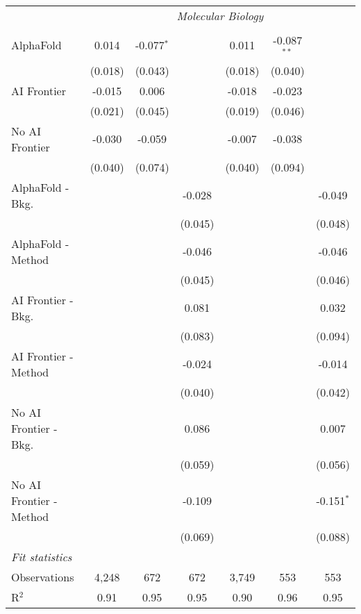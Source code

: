 \begin{tabular}{lcccccc}
 & \multicolumn{6}{c}{\textit{Molecular Biology}} \\ \\
   AlphaFold               & 0.014   & -0.077$^{*}$ &         & 0.011   & -0.087$^{**}$ &   \\   
                           & (0.018) & (0.043)      &         & (0.018) & (0.040)       &   \\   
   AI Frontier             & -0.015  & 0.006        &         & -0.018  & -0.023        &   \\   
                           & (0.021) & (0.045)      &         & (0.019) & (0.046)       &   \\   
   No AI Frontier          & -0.030  & -0.059       &         & -0.007  & -0.038        &   \\   
                           & (0.040) & (0.074)      &         & (0.040) & (0.094)       &   \\   
   AlphaFold - Bkg.        &         &              & -0.028  &         &               & -0.049\\   
                           &         &              & (0.045) &         &               & (0.048)\\   
   AlphaFold - Method      &         &              & -0.046  &         &               & -0.046\\   
                           &         &              & (0.045) &         &               & (0.046)\\   
   AI Frontier - Bkg.      &         &              & 0.081   &         &               & 0.032\\   
                           &         &              & (0.083) &         &               & (0.094)\\   
   AI Frontier - Method    &         &              & -0.024  &         &               & -0.014\\   
                           &         &              & (0.040) &         &               & (0.042)\\   
   No AI Frontier - Bkg.   &         &              & 0.086   &         &               & 0.007\\   
                           &         &              & (0.059) &         &               & (0.056)\\   
   No AI Frontier - Method &         &              & -0.109  &         &               & -0.151$^{*}$\\   
                           &         &              & (0.069) &         &               & (0.088)\\   
   \midrule
   \emph{Fit statistics}\\
   Observations            & 4,248   & 672          & 672     & 3,749   & 553           & 553\\  
   R$^2$                   & 0.91    & 0.95         & 0.95    & 0.90    & 0.96          & 0.95\\  
   

\end{tabular}
